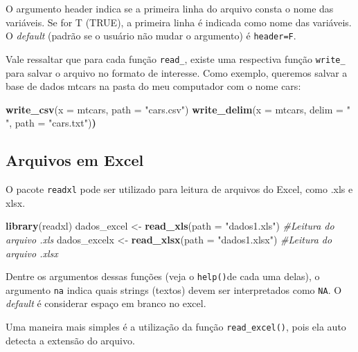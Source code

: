 \documentclass[
]{book}
\newenvironment{Shaded}{\begin{snugshade}}{\end{snugshade}}
\newcommand{\CommentTok}[1]{\textcolor[rgb]{0.56,0.35,0.01}{\textit{#1}}}
\newcommand{\DataTypeTok}[1]{\textcolor[rgb]{0.13,0.29,0.53}{#1}}
\newcommand{\ErrorTok}[1]{\textcolor[rgb]{0.64,0.00,0.00}{\textbf{#1}}}
\newcommand{\KeywordTok}[1]{\textcolor[rgb]{0.13,0.29,0.53}{\textbf{#1}}}
\newcommand{\NormalTok}[1]{#1}
\newcommand{\StringTok}[1]{\textcolor[rgb]{0.31,0.60,0.02}{#1}}
\begin{document}
O argumento header indica se a primeira linha do arquivo consta o nome das variáveis. Se for T (TRUE), a primeira linha é indicada como nome das variáveis. O \emph{default} (padrão se o usuário não mudar o argumento) é \texttt{header=F}.

Vale ressaltar que para cada função \texttt{read\_}, existe uma respectiva função \texttt{write\_} para salvar o arquivo no formato de interesse. Como exemplo, queremos salvar a base de dados mtcars na pasta do meu computador com o nome cars:

\begin{Shaded}
\begin{Highlighting}[]
\KeywordTok{write_csv}\NormalTok{(}\DataTypeTok{x =}\NormalTok{ mtcars, }\DataTypeTok{path =} \StringTok{"cars.csv"}\NormalTok{)}
\KeywordTok{write_delim}\NormalTok{(}\DataTypeTok{x =}\NormalTok{ mtcars, }\DataTypeTok{delim =} \StringTok{" "}\NormalTok{, }\DataTypeTok{path =} \StringTok{"cars.txt"}\NormalTok{)}\ErrorTok{)}
\end{Highlighting}
\end{Shaded}

\hypertarget{arquivos-em-excel}{%
\subsection{Arquivos em Excel}\label{arquivos-em-excel}}

O pacote \texttt{readxl} pode ser utilizado para leitura de arquivos do Excel, como .xls e xlsx.

\begin{Shaded}
\begin{Highlighting}[]
\KeywordTok{library}\NormalTok{(readxl)}
\NormalTok{dados_excel <-}\StringTok{ }\KeywordTok{read_xls}\NormalTok{(}\DataTypeTok{path =} \StringTok{"dados1.xls"}\NormalTok{) }\CommentTok{#Leitura do arquivo .xls}
\NormalTok{dados_excelx <-}\StringTok{ }\KeywordTok{read_xlsx}\NormalTok{(}\DataTypeTok{path =} \StringTok{"dados1.xlsx"}\NormalTok{) }\CommentTok{#Leitura do arquivo .xlsx}
\end{Highlighting}
\end{Shaded}

Dentre os argumentos dessas funções (veja o \texttt{help()}de cada uma delas), o argumento \texttt{na} indica quais strings (textos) devem ser interpretados como \texttt{NA}. O \emph{default} é considerar espaço em branco no excel.

Uma maneira mais simples é a utilização da função \texttt{read\_excel()}, pois ela auto detecta a extensão do arquivo.
\end{document}
